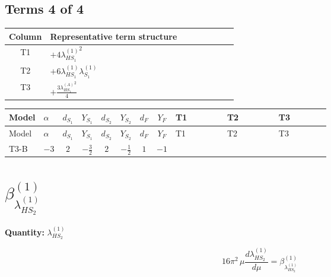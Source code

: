 \documentclass[8pt]{article}
\begin{document}
\begin{landscape}
\subsection*{Terms 4 of 4}
\begin{center}
\begin{tabular}{@{}c >{\raggedright\arraybackslash}p{0.82\linewidth}@{}}
\toprule
Column & Representative term structure \\
\midrule
T1 & \(\displaystyle +4 {\lambda_{HS_1}^{(1)}}^2\) \\
\midrule
T2 & \(\displaystyle +6 {\lambda_{HS_1}^{(1)}} {\lambda_{S_1}^{(1)}}\) \\
\midrule
T3 & \(\displaystyle +\frac{3 {\lambda_{HS_1}^{(A)}}^2}{4}\) \\
\midrule
\bottomrule
\end{tabular}
\end{center}
\smallskip
\tiny
\begin{longtable}{@{}llcccccc >{\raggedright\arraybackslash}p{0.21\linewidth} >{\raggedright\arraybackslash}p{0.21\linewidth} >{\raggedright\arraybackslash}p{0.21\linewidth}@{}}
\toprule
Model & $\alpha$ & $d_{S_1}$ & $Y_{S_1}$ & $d_{S_2}$ & $Y_{S_2}$ & $d_F$ & $Y_F$ & T1 & T2 & T3 \\
\midrule
\endfirsthead
\toprule
Model & $\alpha$ & $d_{S_1}$ & $Y_{S_1}$ & $d_{S_2}$ & $Y_{S_2}$ & $d_F$ & $Y_F$ & T1 & T2 & T3 \\
\midrule
\endhead
T3-B & $-3$ & $2$ & $-\frac{3}{2}$ & $2$ & $-\frac{1}{2}$ & $1$ & $-1$ & \scriptsize\adjustbox{max width=\linewidth}{$\begin{gathered} +4 {\lambda_{HS_1}^{(1)}}^2\end{gathered}$} & \scriptsize\adjustbox{max width=\linewidth}{$\begin{gathered} +6 {\lambda_{HS_1}^{(1)}} {\lambda_{S_1}^{(1)}}\end{gathered}$} & \scriptsize\adjustbox{max width=\linewidth}{$\begin{gathered} +\frac{3 {\lambda_{HS_1}^{(A)}}^2}{4}\end{gathered}$} \\
\midrule
\bottomrule
\end{longtable}
\clearpage
\section*{$\beta_{\lambda_{HS_2}^{(1)}}^{(1)}$}
\noindent\textbf{Quantity: }$\lambda_{HS_2}^{(1)}$\par\smallskip
\[16\pi^2\,\mu\frac{d \lambda_{HS_2}^{(1)}}{d\mu}=\beta_{\lambda_{HS_2}^{(1)}}^{(1)}\]

\end{landscape}
\end{document}
